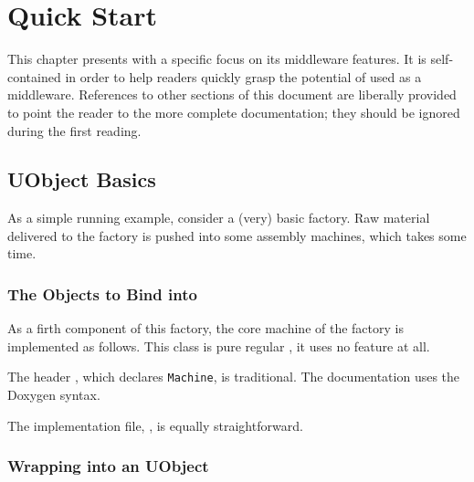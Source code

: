 
\chapter{Quick Start}
\label{sec:uob:quick}

This chapter presents \usdk with a specific focus on its middleware
features.  It is self-contained in order to help readers quickly grasp the
potential of \urbi used as a middleware.  References to other sections of
this document are liberally provided to point the reader to the more
complete documentation; they should be ignored during the first reading.

\newcommand{\machineDir}{\uobjectsDir/test/machine.uob}
\newcommand{\machineFile}[1]
{\cxxPre%
%
\cxxPost}

\section{UObject Basics}
\label{sec:uob:quick:basics}

As a simple running example, consider a (very) basic factory.  Raw material
delivered to the factory is pushed into some assembly machines, which takes
some time.

\subsection{The Objects to Bind into \urbi}

As a firth component of this factory, the core machine of the factory is
implemented as follows.  This class is pure regular \Cxx, it uses no \urbi
feature at all.

The header , which declares \lstinline|Machine|, is
traditional.  The documentation uses the Doxygen syntax.

\machineFile{machine.hh}

The implementation file, , is equally straightforward.

\machineFile{machine.cc}

\subsection{Wrapping into an UObject}

